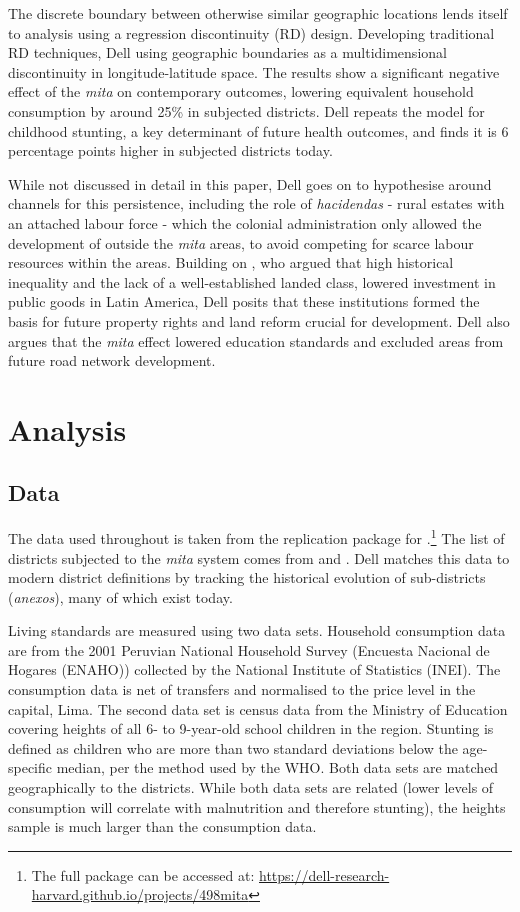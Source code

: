 \documentclass[12pt]{article}
\begin{document}
The discrete boundary between otherwise similar geographic locations lends itself to analysis using a regression discontinuity (RD) design. Developing traditional RD techniques, Dell using geographic boundaries as a multidimensional discontinuity in longitude-latitude space. The results show a significant negative effect of the \emph{mita} on contemporary outcomes, lowering equivalent household consumption by around 25\% in subjected districts. Dell repeats the model for childhood stunting, a key determinant of future health outcomes, and finds it is 6 percentage points higher in subjected districts today. 

While not discussed in detail in this paper, Dell goes on to hypothesise around channels for this persistence, including the role of \emph{hacidendas} - rural estates with an attached labour force - which the colonial administration only allowed the development of outside the \emph{mita} areas, to avoid competing for scarce labour resources within the areas. Building on  \autocite{Engerman1997FactorsEconomies}, who argued that high historical inequality and the lack of a well-established landed class, lowered investment in public goods in Latin America, Dell posits that these institutions formed the basis for future property rights and land reform crucial for development. Dell also argues that the \emph{mita} effect lowered education standards and excluded areas from future road network development.

\section{Analysis}

\subsection{Data}

The data used throughout is taken from the replication package for \autocite{Dell2010Mita}.\footnote{The full package can be accessed at: \url{https://dell-research-harvard.github.io/projects/498mita}} The list of districts subjected to the \emph{mita} system comes from \autocite{Saignes1984Las1595-1665} and \autocite{AmatYJunient1947Sevilla:Americano}. Dell matches this data to modern district definitions by tracking the historical evolution of sub-districts (\emph{anexos}), many of which exist today. 

Living standards are measured using two data sets. Household consumption data are from the 2001 Peruvian National Household Survey (Encuesta Nacional de Hogares (ENAHO)) collected by the National Institute of Statistics (INEI). The consumption data is net of transfers and normalised to the price level in the capital, Lima. The second data set is census data from the Ministry of Education covering heights of all 6- to 9-year-old school children in the region. Stunting is defined as children who are more than two standard deviations below the age-specific median, per the method used by the WHO. Both data sets are matched geographically to the districts. While both data sets are related (lower levels of consumption will correlate with malnutrition and therefore stunting), the heights sample is much larger than the consumption data.
\end{document}
